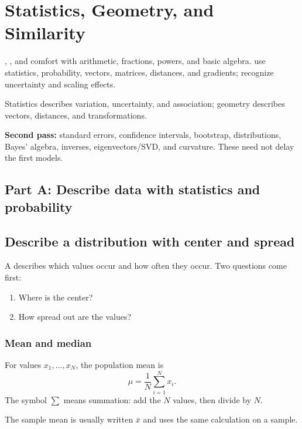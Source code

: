 \chapter{Statistics, Geometry, and Similarity}
\label{ch:foundations}
\label{ch:statistics}
\label{ch:linear-algebra}

\chapterguide%
  {, , and comfort with arithmetic, fractions, powers, and basic algebra.}
  {use statistics, probability, vectors, matrices, distances, and gradients; recognize uncertainty and scaling effects.}

Statistics describes variation, uncertainty, and association; geometry describes vectors, distances, and transformations.

\begin{secondpass}
\textbf{Second pass:} standard errors, confidence intervals, bootstrap, distributions, Bayes' algebra, inverses, eigenvectors/SVD, and curvature. These need not delay the first models.
\end{secondpass}

\section*{Part A: Describe data with statistics and probability}
\section{Describe a distribution with center and spread}

A  describes which values occur and how often they occur. Two questions come first:

\begin{enumerate}
  \item Where is the center?
  \item How spread out are the values?
\end{enumerate}

\subsection{Mean and median}

For values $x_1,\ldots,x_N$, the population mean is
\[
  \mu=\frac{1}{N}\sum_{i=1}^{N}x_i.
\]
The symbol $\sum$ means summation: add the $N$ values, then divide by $N$.

The sample mean is usually written $\bar{x}$ and uses the same calculation on a sample.

